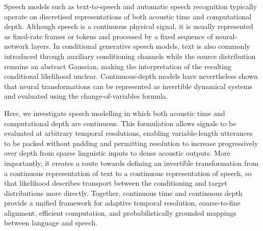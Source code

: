 Speech models such as text-to-speech and automatic speech recognition typically operate on discretised representations of both acoustic time and computational depth. Although speech is a continuous physical signal, it is usually represented as fixed-rate frames or tokens and processed by a fixed sequence of neural-network layers. In conditional generative speech models, text is also commonly introduced through auxiliary conditioning channels while the source distribution remains an abstract Gaussian, making the interpretation of the resulting conditional likelihood unclear. Continuous-depth models have nevertheless shown that neural transformations can be represented as invertible dynamical systems and evaluated using the change-of-variables formula.

Here, we investigate speech modelling in which both acoustic time and computational depth are continuous. This formulation allows signals to be evaluated at arbitrary temporal resolutions, enabling variable-length utterances to be packed without padding and permitting resolution to increase progressively over depth from sparse linguistic inputs to dense acoustic outputs. More importantly, it creates a route towards defining an invertible transformation from a continuous representation of text to a continuous representation of speech, so that likelihood describes transport between the conditioning and target distributions more directly. Together, continuous time and continuous depth provide a unified framework for adaptive temporal resolution, coarse-to-fine alignment, efficient computation, and probabilistically grounded mappings between language and speech.
